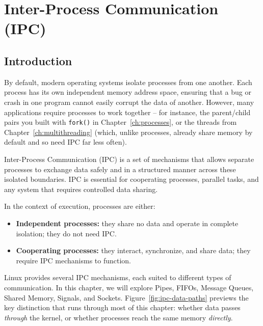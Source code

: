 
\chapter{Inter-Process Communication (IPC)}
\label{ch:ipc}

\section{Introduction}
By default, modern operating systems isolate processes from one another. Each process has its own independent memory address space, ensuring that a bug or crash in one program cannot easily corrupt the data of another. However, many applications require processes to work together -- for instance, the parent/child pairs you built with \texttt{fork()} in Chapter~\ref{ch:processes}, or the threads from Chapter~\ref{ch:multithreading} (which, unlike processes, already share memory by default and so need IPC far less often).

Inter-Process Communication (IPC) is a set of mechanisms that allows separate processes to exchange data safely and in a structured manner across these isolated boundaries. IPC is essential for cooperating processes, parallel tasks, and any system that requires controlled data sharing.

In the context of execution, processes are either:
\begin{itemize}
    \item \textbf{Independent processes:} they share no data and operate in complete isolation; they do not need IPC.
    \item \textbf{Cooperating processes:} they interact, synchronize, and share data; they require IPC mechanisms to function.
\end{itemize}

Linux provides several IPC mechanisms, each suited to different types of communication. In this chapter, we will explore Pipes, FIFOs, Message Queues, Shared Memory, Signals, and Sockets. Figure~\ref{fig:ipc-data-paths} previews the key distinction that runs through most of this chapter: whether data passes \emph{through} the kernel, or whether processes reach the same memory \emph{directly}.

